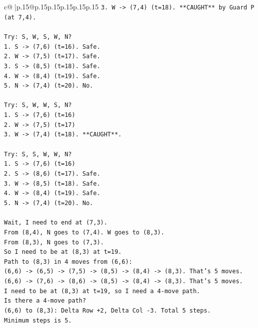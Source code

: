 \documentclass{article}
\begin{document}
{\begin{supertabular}{c@{$\;$}|p{.15\linewidth}@{}p{.15\linewidth}p{.15\linewidth}p{.15\linewidth}p{.15\linewidth}p{.15\linewidth}}
{{{\texttt{3. W {-}> (7,4) (t=18). **CAUGHT** by Guard P (at 7,4).} \\
\\ 
\texttt{Try: S, W, S, W, N?} \\
\texttt{1. S {-}> (7,6) (t=16). Safe.} \\
\texttt{2. W {-}> (7,5) (t=17). Safe.} \\
\texttt{3. S {-}> (8,5) (t=18). Safe.} \\
\texttt{4. W {-}> (8,4) (t=19). Safe.} \\
\texttt{5. N {-}> (7,4) (t=20). No.} \\
\\ 
\texttt{Try: S, W, W, S, N?} \\
\texttt{1. S {-}> (7,6) (t=16)} \\
\texttt{2. W {-}> (7,5) (t=17)} \\
\texttt{3. W {-}> (7,4) (t=18). **CAUGHT**.} \\
\\ 
\texttt{Try: S, S, W, W, N?} \\
\texttt{1. S {-}> (7,6) (t=16)} \\
\texttt{2. S {-}> (8,6) (t=17). Safe.} \\
\texttt{3. W {-}> (8,5) (t=18). Safe.} \\
\texttt{4. W {-}> (8,4) (t=19). Safe.} \\
\texttt{5. N {-}> (7,4) (t=20). No.} \\
\\ 
\texttt{Wait, I need to end at (7,3).} \\
\texttt{From (8,4), N goes to (7,4). W goes to (8,3).} \\
\texttt{From (8,3), N goes to (7,3).} \\
\texttt{So I need to be at (8,3) at t=19.} \\
\texttt{Path to (8,3) in 4 moves from (6,6):} \\
\texttt{(6,6) {-}> (6,5) {-}> (7,5) {-}> (8,5) {-}> (8,4) {-}> (8,3). That's 5 moves.} \\
\texttt{(6,6) {-}> (7,6) {-}> (8,6) {-}> (8,5) {-}> (8,4) {-}> (8,3). That's 5 moves.} \\
\texttt{I need to be at (8,3) at t=19, so I need a 4{-}move path.} \\
\texttt{Is there a 4{-}move path?} \\
\texttt{(6,6) to (8,3): Delta Row +2, Delta Col {-}3. Total 5 steps.} \\
\texttt{Minimum steps is 5.} \\
}}}
\end{supertabular}}
\end{document}
